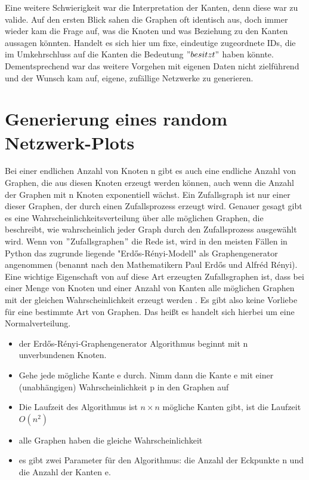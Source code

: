 Eine weitere Schwierigkeit war die Interpretation der Kanten, denn diese war zu valide. 
Auf den ersten Blick sahen die Graphen oft identisch aus, doch immer wieder kam die Frage auf, was die Knoten und was Beziehung zu den Kanten aussagen könnten. Handelt es sich hier um fixe, eindeutige zugeordnete IDs, die im Umkehrschluss auf die Kanten die Bedeutung $"besitzt"$ haben könnte.\\
Dementsprechend war das weitere Vorgehen mit eigenen Daten nicht zielführend und der Wunsch kam auf, eigene, zufällige Netzwerke zu generieren. 

\section{Generierung eines random Netzwerk-Plots} 
Bei einer endlichen Anzahl von Knoten n gibt es auch eine endliche Anzahl von Graphen, die aus diesen Knoten erzeugt werden können, auch wenn die Anzahl der Graphen mit n Knoten exponentiell wächst.
Ein Zufallsgraph ist nur einer dieser Graphen, der durch einen Zufallsprozess erzeugt wird.
Genauer gesagt gibt es eine Wahrscheinlichkeitsverteilung über alle möglichen Graphen, die beschreibt, wie wahrscheinlich jeder Graph durch den Zufallsprozess ausgewählt wird.
Wenn von $"$Zufallsgraphen$"$ die Rede ist, wird in den meisten Fällen in Python das zugrunde liegende "Erdős-Rényi-Modell" als Graphengenerator angenommen (benannt nach den Mathematikern Paul Erdős und Alfréd Rényi). Eine wichtige Eigenschaft von auf diese Art erzeugten Zufallsgraphen ist, dass bei einer Menge von Knoten und einer Anzahl von Kanten alle möglichen Graphen mit der gleichen Wahrscheinlichkeit erzeugt werden \cite{Generators}. Es gibt also keine Vorliebe für eine bestimmte Art von Graphen. Das heißt es handelt sich hierbei um eine Normalverteilung.

\begin{itemize}
    \item der Erdős-Rényi-Graphengenerator Algorithmus beginnt mit n unverbundenen Knoten.
    \item Gehe jede mögliche Kante e durch. Nimm dann die Kante e mit einer (unabhängigen) Wahrscheinlichkeit p in den Graphen auf
    \item Die Laufzeit des Algorithmus ist $n \times n$ mögliche Kanten gibt, ist die Laufzeit $O(n^2)$
    \item alle Graphen haben die gleiche Wahrscheinlichkeit
    \item es gibt zwei Parameter für den Algorithmus: die Anzahl der Eckpunkte n und die Anzahl der Kanten e.
\end{itemize}


